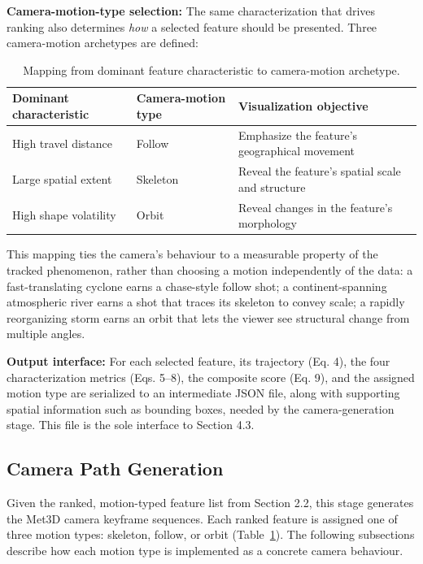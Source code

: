 \documentclass[journal abbreviation, manuscript]{copernicus}
\begin{document}
\textbf{Camera-motion-type selection:} The same characterization that drives ranking also determines \textit{how} a selected feature should be presented. Three camera-motion archetypes are defined:

\begin{table}[htbp]
\centering
\caption{Mapping from dominant feature characteristic to camera-motion archetype.}
\label{tab:camera-motion}
\begin{tabular}{lll}
\hline
\textbf{Dominant characteristic} &
\textbf{Camera-motion type} &
\textbf{Visualization objective} \\
\hline
High travel distance &
Follow &
Emphasize the feature's geographical movement \\

Large spatial extent &
Skeleton &
Reveal the feature's spatial scale and structure \\

High shape volatility &
Orbit &
Reveal changes in the feature's morphology \\
\hline
\end{tabular}
\end{table}

This mapping ties the camera's behaviour to a measurable property of the tracked phenomenon, rather than choosing a motion independently of the data: a fast-translating cyclone earns a chase-style follow shot; a continent-spanning atmospheric river earns a shot that traces its skeleton to convey scale; a rapidly reorganizing storm earns an orbit that lets the viewer see structural change from multiple angles.

\textbf{Output interface:} For each selected feature, its trajectory (Eq. 4), the four characterization metrics (Eqs. 5--8), the composite score (Eq. 9), and the assigned motion type are serialized to an intermediate JSON file, along with supporting spatial information such as bounding boxes, needed by the camera-generation stage. This file is the sole interface to Section 4.3.


\subsection{Camera Path Generation}

Given the ranked, motion-typed feature list from Section 2.2, this stage
generates the Met3D camera keyframe sequences. Each ranked feature is
assigned one of three motion types: skeleton, follow, or orbit
(Table~\ref{tab:camera-motion}). The following subsections describe how
each motion type is implemented as a concrete camera behaviour.
\end{document}
